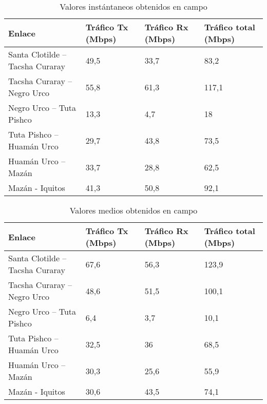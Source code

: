 \begin{table}[H]
	\begin{center}
		\begin{tabular}{|l|l|l|l|}
			\hline
			Enlace & Tráfico Tx (Mbps) & Tráfico Rx (Mbps) & Tráfico total (Mbps) \\
			\hline 
			Santa Clotilde – Tacsha Curaray & 49,5 & 33,7 & 83,2  \\ \hline
			Tacsha Curaray – Negro Urco & 55,8 & 61,3 & 117,1 \\ \hline
			Negro Urco – Tuta Pishco & 13,3 & 4,7 & 18 \\ \hline
			Tuta Pishco – Huamán Urco & 29,7 & 43,8 & 73,5 \\ \hline
			Huamán Urco – Mazán & 33,7 & 28,8 & 62,5 \\ \hline
			Mazán - Iquitos & 41,3 & 50,8 & 92,1 \\ \hline
		\end{tabular}
	\end{center}
	\caption{Valores instántaneos obtenidos en campo }
	\label{table:medidasInstNapo}
\end{table}

\begin{table}[H]
	\begin{center}
		\begin{tabular}{|l|l|l|l|}
			\hline
			Enlace & Tráfico Tx (Mbps) & Tráfico Rx (Mbps) & Tráfico total (Mbps)\\
			\hline 
			Santa Clotilde – Tacsha Curaray & 67,6 & 56,3 & 123,9\\ \hline
			Tacsha Curaray – Negro Urco & 48,6 & 51,5 & 100,1 \\ \hline
			Negro Urco – Tuta Pishco & 6,4 & 3,7 & 10,1 \\ \hline
			Tuta Pishco – Huamán Urco & 32,5 & 36 & 68,5 \\ \hline
			Huamán Urco – Mazán & 30,3 & 25,6 & 55,9 \\ \hline
			Mazán - Iquitos & 30,6 & 43,5 & 74,1 \\ \hline
		\end{tabular}
	\end{center}
	\caption{Valores medios obtenidos en campo}
	\label{table:medidasMediasNapo}
\end{table}

